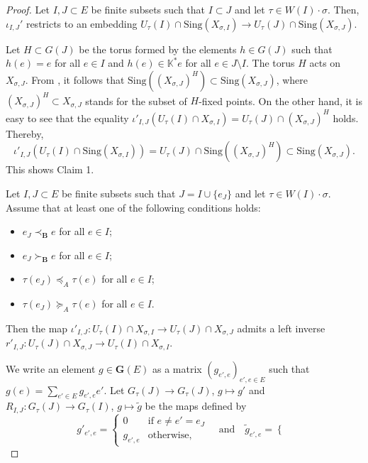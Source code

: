 \documentclass[12pt]{amsart}
\theoremstyle{definition}
\begin{document}
\begin{proof}
\medskip
{} Let $I,J\subset E$ be finite subsets such that $I\subset J$ and let $\tau\in W(I)\cdot\sigma$. Then, $\iota_{I,J}'$ restricts to an embedding $U_\tau(I)\cap\mathrm{Sing}(X_{\sigma,I})\to U_\tau(J)\cap\mathrm{Sing}(X_{\sigma,J})$.

Let $H\subset G(J)$ be the torus formed by the elements $h\in G(J)$ such that $h(e)=e$ for all $e\in I$ and $h(e)\in\mathbb{K}^*e$ for all $e\in J\setminus I$.
The torus $H$ acts on $X_{\sigma,J}$. From \cite{Iversen}, it follows that $\mathrm{Sing}((X_{\sigma,J})^H)\subset \mathrm{Sing}(X_{\sigma,J})$, where $(X_{\sigma,J})^H\subset X_{\sigma,J}$ stands for the subset of $H$-fixed points.
On the other hand, 
it is easy to see that the equality $\iota'_{I,J}(U_\tau(I)\cap X_{\sigma,I})=U_\tau(J)\cap (X_{\sigma,J})^H$ holds.
Thereby, 
\[\iota'_{I,J}(U_\tau(I)\cap \mathrm{Sing}(X_{\sigma,I}))=U_\tau(J)\cap\mathrm{Sing}((X_{\sigma,J})^H)\subset\mathrm{Sing}(X_{\sigma,J}).\]
This shows Claim 1.

\medskip
{} 
Let $I,J\subset E$ be finite subsets such that $J=I\cup\{e_J\}$ and let $\tau\in W(I)\cdot\sigma$. Assume that at least one of the following conditions holds:
\begin{itemize}
\item[\rm (i)] $e_J\prec_\mathbf{B}e$ for all $e\in I$; 
\item[\rm (ii)] $e_J\succ_\mathbf{B}e$ for all $e\in I$;
\item[\rm (iii)] $\tau(e_J)\preceq_A\tau(e)$ for all $e\in I$;
\item[\rm (iv)] $\tau(e_J)\succeq_A\tau(e)$ for all $e\in I$.
\end{itemize}
Then the map $\iota'_{I,J}:U_{\tau}(I)\cap X_{\sigma,I}\to
U_{\tau}(J)\cap X_{\sigma,J}$ admits a left
inverse $r'_{I,J}:U_{\tau}(J)\cap X_{\sigma,J}\to U_{\tau}(I)\cap
X_{\sigma,I}$.

\smallskip
We write an element $g\in \mathbf{G}(E)$ as a matrix
$(g_{e',e})_{e',e\in E}$ such that $g(e)=\sum_{e'\in E}g_{e',e}e'$.
Let $G_\tau(J)\to G_\tau(J)$, $g\mapsto g'$ and 
$R_{I,J}:G_\tau(J)\to G_\tau(I)$, $g\mapsto \tilde{g}$ be the
maps defined by
\begin{equation}
\label{newnew-19}
g'_{e',e}=\left\{
\begin{array}{ll}
0 & \mbox{if $e\not=e'=e_J$} \\
g_{e',e} & \mbox{otherwise},
\end{array}
\right.
\quad\mbox{and}\quad
\tilde{g}_{e',e}=\left\{
\begin{array}{ll}


\end{array}
\end{equation}
\end{proof}
\end{document}
